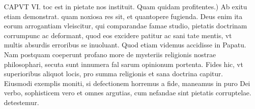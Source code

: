 \documentclass{article}
\begin{document}
\begin{pages}
\marginpar{[ p.87 ]}CAPVT VI. \pstart toc est in pietate nos instituit.  \pend\pstart Quam quidam profitentes.) Ab exitu etiam demonstrat. quam noxiosa res sit, et quantopere fugienda. Deus enim ita eorum arrogantiam vleiscitur, qui comparandae famae studio, pietatis doctrinam corrumpunc ac deformant, quod eos excidere patitur ac sani tate mentis, vt multis absurdis erroribus se inuoluant. Quod etiam videmus accidisse in Papatu. Nam postquam coeperunt profano more de mysteriis religionis nostrae philosophari, secuta sunt innumera fal sarum opinionum portenta. Fides hic, vt superioribus aliquot locis, pro summa religionis et sana doctrina capitur. Eiusmodi exemplis moniti, si defectionem horremus a fide, maneamus in puro Dei verbo, sophisticem vero et omnes argutias, cum nefandae sint pietatis corruptelae. detestemur.  \pend
\endnumbering
\end{pages}
\end{document}
